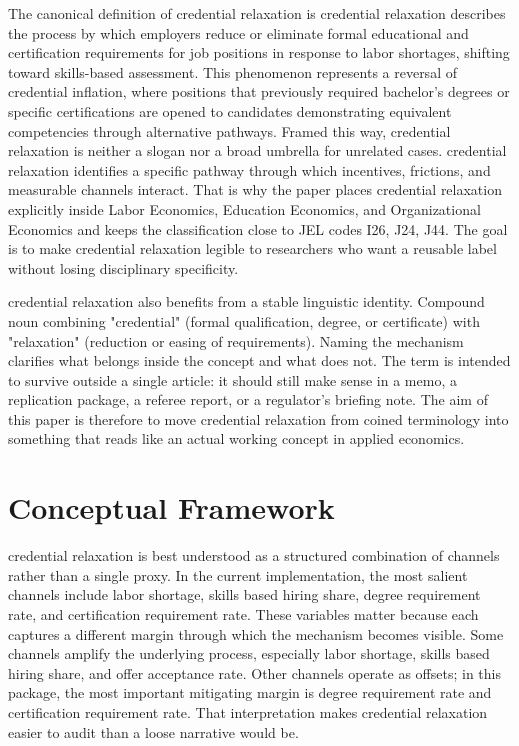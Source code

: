 \documentclass[12pt]{article}
\begin{document}
The canonical definition of credential relaxation is credential relaxation describes the process by which employers reduce or eliminate formal educational and certification requirements for job positions in response to labor shortages, shifting toward skills-based assessment. This phenomenon represents a reversal of credential inflation, where positions that previously required bachelor's degrees or specific certifications are opened to candidates demonstrating equivalent competencies through alternative pathways. Framed this way, credential relaxation is neither a slogan nor a broad umbrella for unrelated cases. credential relaxation identifies a specific pathway through which incentives, frictions, and measurable channels interact. That is why the paper places credential relaxation explicitly inside Labor Economics, Education Economics, and Organizational Economics and keeps the classification close to JEL codes I26, J24, J44. The goal is to make credential relaxation legible to researchers who want a reusable label without losing disciplinary specificity.

credential relaxation also benefits from a stable linguistic identity. Compound noun combining "credential" (formal qualification, degree, or certificate) with "relaxation" (reduction or easing of requirements). Naming the mechanism clarifies what belongs inside the concept and what does not. The term is intended to survive outside a single article: it should still make sense in a memo, a replication package, a referee report, or a regulator's briefing note. The aim of this paper is therefore to move credential relaxation from coined terminology into something that reads like an actual working concept in applied economics.

\section{Conceptual Framework}
credential relaxation is best understood as a structured combination of channels rather than a single proxy. In the current implementation, the most salient channels include labor shortage, skills based hiring share, degree requirement rate, and certification requirement rate. These variables matter because each captures a different margin through which the mechanism becomes visible. Some channels amplify the underlying process, especially labor shortage, skills based hiring share, and offer acceptance rate. Other channels operate as offsets; in this package, the most important mitigating margin is degree requirement rate and certification requirement rate. That interpretation makes credential relaxation easier to audit than a loose narrative would be.
\end{document}
